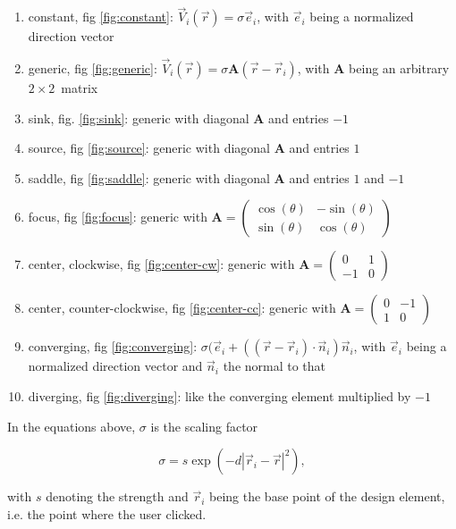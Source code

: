 \documentclass[a4paper,10pt,notitlepage]{scrartcl}
\newcommand{\mat}[1]{\mathbf{#1}}
\begin{document}
\begin{enumerate}
 \item constant, fig \ref{fig:constant}: $\vec{V}_i(\vec{r}) = \sigma
\vec{e}_i$, with $\vec{e}_i$ being a normalized direction vector
 \item generic, fig \ref{fig:generic}: $\vec{V}_i(\vec{r}) = \sigma \mat{A}
(\vec{r} - \vec{r}_i) $, with $\mat{A}$ being an arbitrary $2\times2$~matrix
 \item sink, fig. \ref{fig:sink}: generic with diagonal $\mat{A}$ and entries
$-1$
 \item source, fig \ref{fig:source}: generic with diagonal $\mat{A}$ and
entries $1$
 \item saddle, fig \ref{fig:saddle}: generic with diagonal $\mat{A}$ and
entries $1$ and $-1$
 \item focus, fig \ref{fig:focus}: generic with $\mat{A} = \left(
\begin{array}{cc}
\cos(\theta) & -\sin(\theta) \\
\sin(\theta) & \cos(\theta) \end{array} \right)$
 \item center, clockwise, fig \ref{fig:center-cw}: generic with $\mat{A} =
\left(
\begin{array}{cc}
0 & 1 \\
-1 & 0 \end{array} \right)$
 \item center, counter-clockwise, fig \ref{fig:center-cc}: generic with $\mat{A}
= \left(
\begin{array}{cc}
0 & -1 \\
1 & 0 \end{array} \right)$
 \item converging, fig \ref{fig:converging}: $\sigma (\vec{e}_i + ((\vec{r} -
\vec{r}_i) \cdot \vec{n}_i) \vec{n}_i$, with $\vec{e}_i$ being a normalized
direction vector and $\vec{n}_i$ the normal to that
 \item diverging, fig \ref{fig:diverging}: like the converging element
multiplied by $-1$
\end{enumerate}

In the equations above, $\sigma$ is the scaling factor

\begin{equation}
 \sigma = s \exp(-d |\vec{r}_i - \vec{r}|^2),
\end{equation}

with $s$ denoting the strength and $\vec{r}_i$ being the base point of the
design element, i.e. the point where the user clicked.
\end{document}
